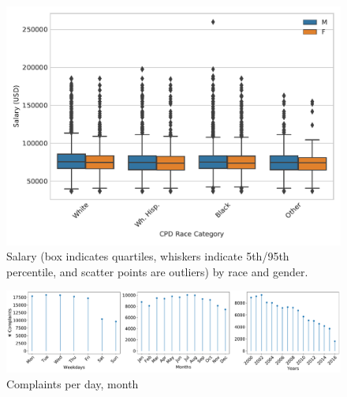 \begin{figure}[t!] 
	\includegraphics[width=\textwidth]{figs/salary_by_race_gender} 
	\caption{Salary (box indicates quartiles, whiskers indicate 5th/95th percentile, and scatter points are outliers) by race and gender.} \label{fig:salary_gender_race}
\end{figure}

\begin{figure}[t!]
	\includegraphics[width=\textwidth, clip, trim= 0 0 460 0]{figs/complaints_times} 
\caption{Complaints per day, month}
\end{figure}



